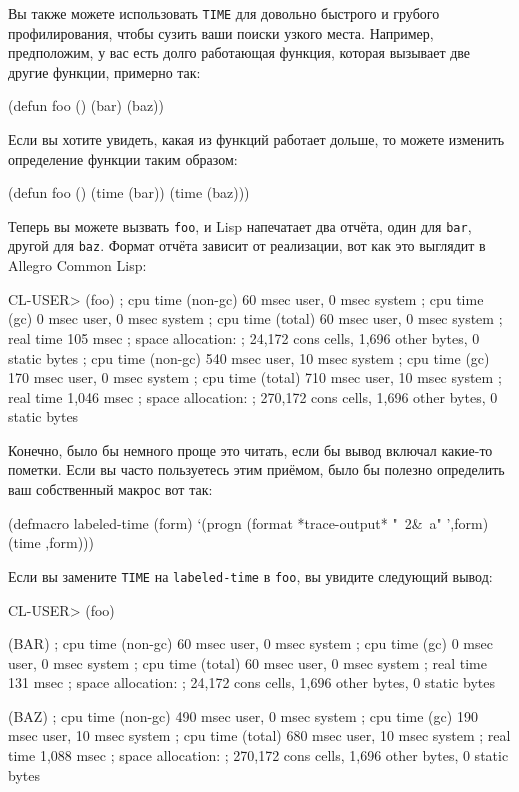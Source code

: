 Вы также можете использовать \lstinline{TIME} для довольно быстрого и грубого
профилирования, чтобы сузить ваши поиски узкого места. Например, предположим, у вас есть
долго работающая функция, которая вызывает две другие функции, примерно так:

\begin{myverb}
(defun foo ()
  (bar)
  (baz))
\end{myverb}

Если вы хотите увидеть, какая из функций работает дольше, то можете изменить определение
функции таким образом:

\begin{myverb}
(defun foo ()
  (time (bar))
  (time (baz)))
\end{myverb}

Теперь вы можете вызвать \lstinline{foo}, и Lisp напечатает два отчёта, один для \lstinline{bar},
другой для \lstinline{baz}. Формат отчёта зависит от реализации, вот как это выглядит в Allegro
Common Lisp:

\begin{myverb}
CL-USER> (foo)
; cpu time (non-gc) 60 msec user, 0 msec system
; cpu time (gc)     0 msec user, 0 msec system
; cpu time (total)  60 msec user, 0 msec system
; real time  105 msec
; space allocation:
;  24,172 cons cells, 1,696 other bytes, 0 static bytes
; cpu time (non-gc) 540 msec user, 10 msec system
; cpu time (gc)     170 msec user, 0 msec system
; cpu time (total)  710 msec user, 10 msec system
; real time  1,046 msec
; space allocation:
;  270,172 cons cells, 1,696 other bytes, 0 static bytes
\end{myverb}

Конечно, было бы немного проще это читать, если бы вывод включал какие-то пометки. Если вы
часто пользуетесь этим приёмом, было бы полезно определить ваш собственный макрос вот так:

\begin{myverb}
(defmacro labeled-time (form)
  `(progn
    (format *trace-output* "~2&~a" ',form)
    (time ,form)))
\end{myverb}

Если вы замените \lstinline{TIME} на \lstinline{labeled-time} в \lstinline{foo}, вы увидите следующий
вывод:

\begin{myverb}
CL-USER> (foo)

(BAR)
; cpu time (non-gc) 60 msec user, 0 msec system
; cpu time (gc)     0 msec user, 0 msec system
; cpu time (total)  60 msec user, 0 msec system
; real time  131 msec
; space allocation:
;  24,172 cons cells, 1,696 other bytes, 0 static bytes

(BAZ)
; cpu time (non-gc) 490 msec user, 0 msec system
; cpu time (gc)     190 msec user, 10 msec system
; cpu time (total)  680 msec user, 10 msec system
; real time  1,088 msec
; space allocation:
;  270,172 cons cells, 1,696 other bytes, 0 static bytes
\end{myverb}

